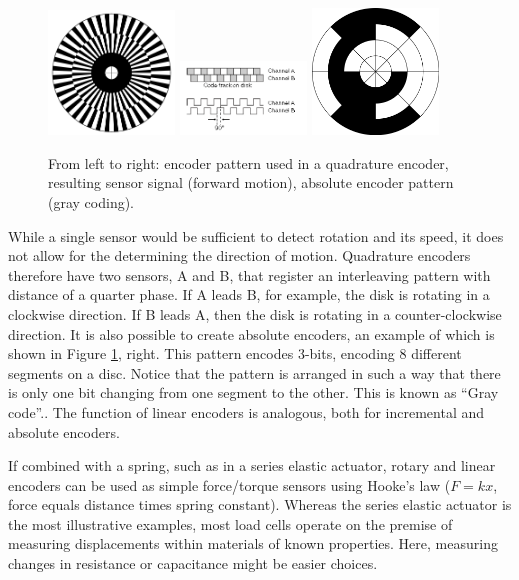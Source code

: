\begin{figure}
	\centering
		\includegraphics[width=0.3\textwidth]{figs/encoderdisk.png}
		\includegraphics[width=0.3\textwidth]{figs/quadraturencoder.png}
		\includegraphics[width=0.3\textwidth]{figs/absoluteencoder.png}
	\caption{From left to right: encoder pattern used in a quadrature encoder, resulting sensor signal (forward motion), absolute encoder pattern (gray coding).}
	\label{fig:encoders}
\end{figure}

While a single sensor would be sufficient to detect rotation and its speed, it does not allow for the determining the direction of motion. Quadrature encoders therefore have two sensors, A and B, that register an interleaving pattern with distance of a quarter phase. If A leads B, for example, the disk is rotating in a clockwise direction. If B leads A, then the disk is rotating in a counter-clockwise direction. It is also possible to create absolute encoders, an example of which is shown in Figure \ref{fig:encoders}, right. This pattern encodes 3-bits, encoding 8 different segments on a disc. Notice that the pattern is arranged in such a way that there is only one bit changing from one segment to the other. This is known as ``Gray code''.. The function of linear encoders is analogous, both for incremental and absolute encoders.

If combined with a spring, such as in a series elastic actuator, rotary and linear encoders can be used as simple force/torque sensors using Hooke's law ($F=kx$, force equals distance times spring constant). Whereas the series elastic actuator is the most illustrative examples, most load cells operate on the premise of measuring displacements within materials of known properties. Here, measuring changes in resistance or capacitance might be easier choices.

